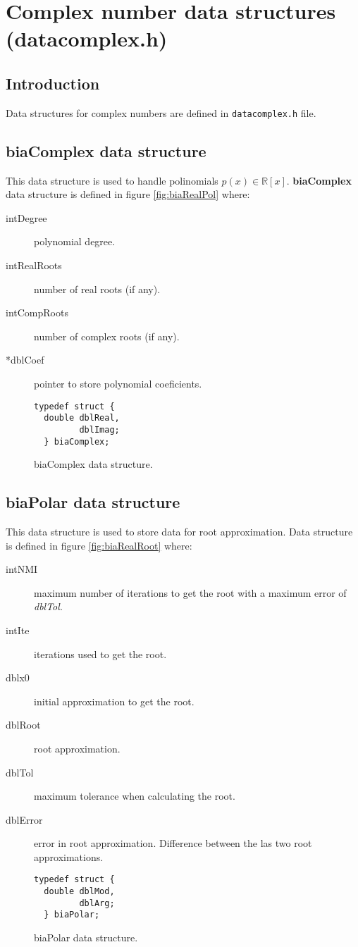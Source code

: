 %
%

\chapter{Complex number data structures (datacomplex.h)} \label{ch:datacomplex}

\section{Introduction}

Data structures for complex numbers are defined in \texttt{datacomplex.h} file.

\section{\textbf{biaComplex} data structure} \label{sec:biaComplex}

This data structure is used to handle polinomials $p(x) \in \mathbb{R}[x]$. \textbf{biaComplex} data structure is defined in figure \ref{fig:biaRealPol} where:

\begin{description}
\item[intDegree] polynomial degree.
\item[intRealRoots] number of real roots (if any).
\item[intCompRoots] number of complex roots (if any).
\item[*dblCoef] pointer to store polynomial coeficients.
\end{description}

\begin{figure}[!h]
\begin{verbatim}
typedef struct {
  double dblReal,
         dblImag;
  } biaComplex;
\end{verbatim}
\caption{biaComplex data structure.} \label{fig:biaComplex}
\end{figure}

\section{\textbf{biaPolar} data structure} \label{sec:biaPolar}

This data structure is used to store data for root approximation. Data structure is defined in figure \ref{fig:biaRealRoot} where:

\begin{description}
\item[intNMI] maximum number of iterations to get the root with a maximum error of \emph{dblTol}.
\item[intIte] iterations used to get the root.
\item[dblx0] initial approximation to get the root.
\item[dblRoot] root approximation.
\item[dblTol] maximum tolerance when calculating the root.
\item[dblError] error in root approximation. Difference between the las two root approximations.
\end{description}

\begin{figure}[!h]
\begin{verbatim}
typedef struct {
  double dblMod,
         dblArg;
  } biaPolar;
\end{verbatim}
\caption{biaPolar data structure.} \label{fig:biaPolar}
\end{figure}
